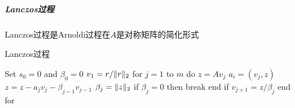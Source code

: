 \documentclass[UTF8]{article}
\begin{document}
\begin{flushleft}
\subparagraph{Lanczos过程}
Lanczos过程是Arnoldi过程在$A$是对称矩阵的简化形式
\begin{algorithm}[H]
\caption{Lanczos过程}
\begin{algorithmic}[1]
  \State Set $s_0=0$ and $\beta _0=0$
  \State $v_1=r/\Arrowvert r \Arrowvert _2$
  \State for $j=1$ to $m$ do
  \State \qquad $z=Av_j$
  \State \qquad $a_i=(v_j,z)$
  \State \qquad $z=z-a_jv_j-\beta _{j-1}v_{j-1}$
  \State \qquad $\beta _j=\Arrowvert z \Arrowvert _2$
  \State \qquad if $\beta _j=0$ then
  \State \qquad \qquad break
  \State \qquad end if
  \State \qquad $v_{j+1}=z/\beta _j$
  \State end for
\end{algorithmic}
\end{algorithm}

\end{flushleft}
\end{document}
